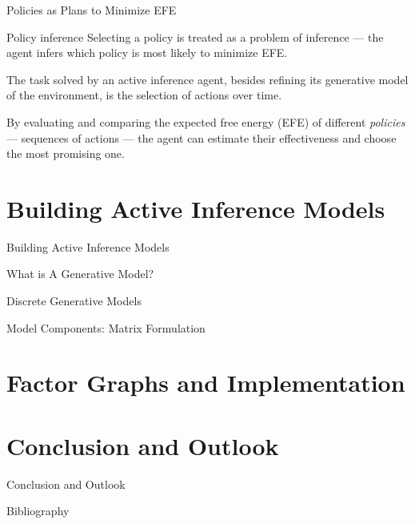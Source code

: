 \documentclass[aspectratio=1610, english]{beamer}
\begin{document}
\begin{frame}{Policies as Plans to Minimize EFE}
    \begin{block}{Policy inference}
        Selecting a policy is treated as a problem of inference — the agent infers which policy is most likely to minimize EFE.
    \end{block}
    
    The task solved by an active inference agent, besides refining its generative model of the environment, is the selection of actions over time.
    
    \vspace{0.3cm}
    
    By evaluating and comparing the expected free energy (EFE) of different \emph{policies} — sequences of actions — the agent can estimate their effectiveness and choose the most promising one.
\end{frame}


\section{Building Active Inference Models}
\begin{frame}{Building Active Inference Models}
    \sectionpage
\end{frame}

\begin{frame}{What is A Generative Model?}
    
\end{frame}

\begin{frame}{Discrete Generative Models}

\end{frame}

\begin{frame}{Model Components: Matrix Formulation}

\end{frame}


\section{Factor Graphs and Implementation}


\section{Conclusion and Outlook}
\begin{frame}{Conclusion and Outlook}
    \sectionpage
\end{frame}


\begin{frame}{Bibliography}
{}

\end{frame}
\end{document}
